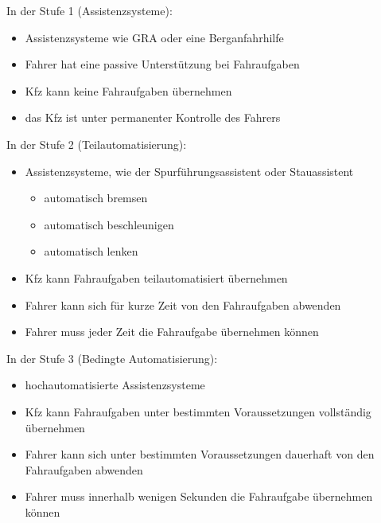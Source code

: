\vspace{0.5cm}

In der Stufe 1 (Assistenzsysteme):
\begin{itemize}
	\item Assistenzsysteme wie \ac{GRA} oder eine Berganfahrhilfe
	\item Fahrer hat eine passive Unterstützung bei Fahraufgaben
	\item \ac{Kfz} kann keine Fahraufgaben übernehmen
	\item das \ac{Kfz} ist unter permanenter Kontrolle des Fahrers
\end{itemize}

\vspace{0.5cm}

In der Stufe 2 (Teilautomatisierung):
\begin{itemize}
	\item Assistenzsysteme, wie der Spurführungsassistent oder Stauassistent
	      \begin{itemize}
		      \item automatisch bremsen
		      \item automatisch beschleunigen
		      \item automatisch lenken
	      \end{itemize}
	\item \ac{Kfz} kann Fahraufgaben teilautomatisiert übernehmen
	\item Fahrer kann sich für kurze Zeit von den Fahraufgaben abwenden
	\item Fahrer muss jeder Zeit die Fahraufgabe übernehmen können
\end{itemize}

\vspace{0.5cm}

In der Stufe 3 (Bedingte Automatisierung):
\begin{itemize}
	\item hochautomatisierte Assistenzsysteme
	\item \ac{Kfz} kann Fahraufgaben unter bestimmten Voraussetzungen vollständig übernehmen
	\item Fahrer kann sich unter bestimmten Voraussetzungen dauerhaft von den Fahraufgaben abwenden
	\item Fahrer muss innerhalb wenigen Sekunden die Fahraufgabe übernehmen können
\end{itemize}

\vspace{0.5cm}

